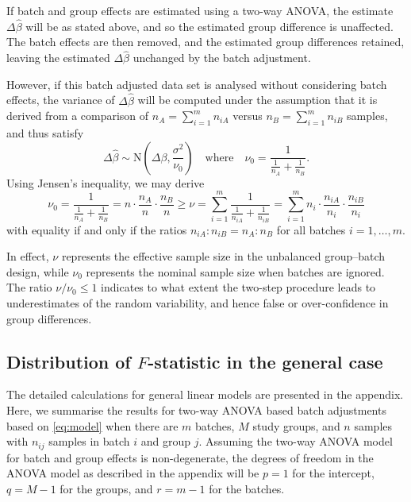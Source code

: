 \documentclass{bio}
\begin{document}
If batch and group effects are estimated using a two-way ANOVA, the estimate $\Delta\hat{\beta}$ will be as stated above, and so the estimated group difference is unaffected. The batch effects are then removed, and the estimated group differences retained, leaving the estimated $\Delta\hat{\beta}$ unchanged by the batch adjustment.

However, if this batch adjusted data set is analysed without considering batch effects, the variance of $\Delta\hat{\beta}$ will be computed under the assumption that it is derived from a comparison of $n_A=\sum_{i=1}^m n_{iA}$ versus $n_B=\sum_{i=1}^m n_{iB}$ samples, and thus satisfy
\begin{equation}
\Delta\hat{\beta}
\sim\text{N}\left(\Delta\beta,\frac{\sigma^2}{\nu_0}\right)
\quad\text{where}\quad
\nu_0=\frac{1}{\frac{1}{n_A}+\frac{1}{n_B}}.
\end{equation}
Using Jensen's inequality, we may derive
\begin{equation}
\nu_0
=\frac{1}{\frac{1}{n_A}+\frac{1}{n_B}}=n\cdot\frac{n_A}{n}\cdot\frac{n_B}{n}
\ge
\nu
=\sum_{i=1}^m \frac{1}{\frac{1}{n_{iA}}+\frac{1}{n_{iB}}}
=\sum_{i=1}^m n_i\cdot\frac{n_{iA}}{n_i}\cdot\frac{n_{iB}}{n_i}
\end{equation}
with equality if and only if the ratios $n_{iA}:n_{iB}=n_A:n_B$ for all batches $i=1,\ldots,m$.

In effect, $\nu$ represents the effective sample size in the unbalanced group--batch design, while $\nu_0$ represents the nominal sample size when batches are ignored. The ratio $\nu/\nu_0\le1$ indicates to what extent the two-step procedure leads to underestimates of the random variability, and hence false or over-confidence in group differences.


\subsection{Distribution of $F$-statistic in the general case}

The detailed calculations for general linear models are presented in the appendix. Here, we summarise the results for two-way ANOVA based batch adjustments based on \eqref{eq:model} when there are $m$ batches, $M$ study groups, and $n$ samples with $n_{ij}$ samples in batch $i$ and group $j$. Assuming the two-way ANOVA model for batch and group effects is non-degenerate, the degrees of freedom in the ANOVA model as described in the appendix will be $p=1$ for the intercept, $q=M-1$ for the groups, and $r=m-1$ for the batches.
\end{document}
